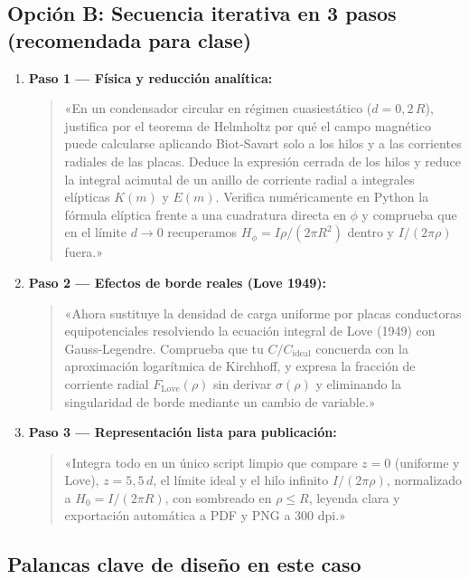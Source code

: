 \documentclass[11pt]{article}
\begin{document}
\subsection{Opción B: Secuencia iterativa en 3 pasos (recomendada para clase)}

\begin{enumerate}
    \item \textbf{Paso 1 --- Física y reducción analítica:}
    \begin{quote}
    «En un condensador circular en régimen cuasiestático ($d = 0{,}2\,R$), justifica por el teorema de Helmholtz por qué el campo magnético puede calcularse aplicando Biot-Savart solo a los hilos y a las corrientes radiales de las placas. Deduce la expresión cerrada de los hilos y reduce la integral acimutal de un anillo de corriente radial a integrales elípticas $K(m)$ y $E(m)$. Verifica numéricamente en Python la fórmula elíptica frente a una cuadratura directa en $\phi$ y comprueba que en el límite $d \to 0$ recuperamos $H_\phi = I\rho/(2\pi R^2)$ dentro y $I/(2\pi\rho)$ fuera.»
    \end{quote}

    \item \textbf{Paso 2 --- Efectos de borde reales (Love 1949):}
    \begin{quote}
    «Ahora sustituye la densidad de carga uniforme por placas conductoras equipotenciales resolviendo la ecuación integral de Love (1949) con Gauss-Legendre. Comprueba que tu $C/C_{\mathrm{ideal}}$ concuerda con la aproximación logarítmica de Kirchhoff, y expresa la fracción de corriente radial $F_{\mathrm{Love}}(\rho)$ sin derivar $\sigma(\rho)$ y eliminando la singularidad de borde mediante un cambio de variable.»
    \end{quote}

    \item \textbf{Paso 3 --- Representación lista para publicación:}
    \begin{quote}
    «Integra todo en un único script limpio que compare $z = 0$ (uniforme y Love), $z = 5{,}5\,d$, el límite ideal y el hilo infinito $I/(2\pi\rho)$, normalizado a $H_0 = I/(2\pi R)$, con sombreado en $\rho \le R$, leyenda clara y exportación automática a PDF y PNG a 300 dpi.»
    \end{quote}
\end{enumerate}

\subsection{Palancas clave de diseño en este caso}
\end{document}
